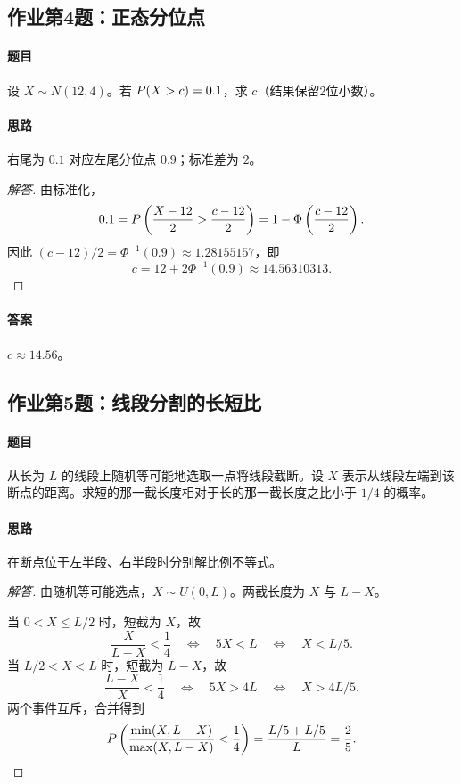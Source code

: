 \subsection{作业第4题：正态分位点}\label{ex:w09-h4}
\paragraph{题目}
设 $X\sim N(12,4)$。若 $\P(X>c)=0.1$，求 $c$（结果保留2位小数）。
\paragraph{思路} 右尾为 $0.1$ 对应左尾分位点 $0.9$；标准差为 $2$。
\begin{proof}[解答]
由标准化，
\[
0.1=\P\left(\frac{X-12}{2}>\frac{c-12}{2}\right)
=1-\Phi\left(\frac{c-12}{2}\right).
\]
因此 $(c-12)/2=\Phi^{-1}(0.9)\approx1.28155157$，即
\[
c=12+2\Phi^{-1}(0.9)\approx14.56310313.
\]
\end{proof}
\paragraph{答案} $c\approx14.56$。

\subsection{作业第5题：线段分割的长短比}\label{ex:w09-h5}
\paragraph{题目}
从长为 $L$ 的线段上随机等可能地选取一点将线段截断。设 $X$ 表示从线段左端到该断点的距离。求短的那一截长度相对于长的那一截长度之比小于 $1/4$ 的概率。
\paragraph{思路} 在断点位于左半段、右半段时分别解比例不等式。
\begin{proof}[解答]
由随机等可能选点，$X\sim U(0,L)$。两截长度为 $X$ 与 $L-X$。

当 $0<X\leq L/2$ 时，短截为 $X$，故
\[
\frac{X}{L-X}<\frac14
\quad\Longleftrightarrow\quad 5X<L
\quad\Longleftrightarrow\quad X<L/5.
\]
当 $L/2<X<L$ 时，短截为 $L-X$，故
\[
\frac{L-X}{X}<\frac14
\quad\Longleftrightarrow\quad 5X>4L
\quad\Longleftrightarrow\quad X>4L/5.
\]
两个事件互斥，合并得到
\[
\P\left(\frac{\min(X,L-X)}{\max(X,L-X)}<\frac14\right)
=\frac{L/5+L/5}{L}=\frac25.
\]
\end{proof}
